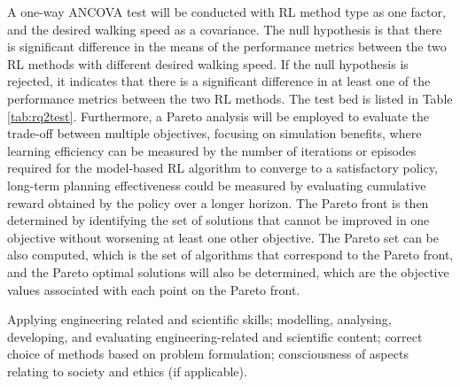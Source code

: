 A one-way ANCOVA test will be conducted with RL method type as one factor, and the desired walking speed as a covariance. The null hypothesis is that there is significant difference in the means of the performance metrics between the two RL methods with different desired walking speed. If the null hypothesis is rejected, it indicates that there is a significant difference in at least one of the performance metrics between the two RL methods. The test bed is listed in Table \ref{tab:rq2test}. Furthermore, a Pareto analysis will be employed to evaluate the trade-off between multiple objectives, focusing on simulation benefits, where learning efficiency can be measured by the number of iterations or episodes required for the model-based RL algorithm to converge to a satisfactory policy, long-term planning effectiveness could be measured by evaluating cumulative reward obtained by the policy over a longer horizon. The Pareto front is then determined by identifying the set of solutions that cannot be improved in one objective without worsening at least one other objective. The Pareto set can be also computed, which is the set of algorithms that correspond to the Pareto front, and the Pareto optimal solutions will also be determined, which are the objective values associated with each point on the Pareto front. 


Applying engineering related and scientific skills; modelling, analysing, developing, and evaluating engineering-related and scientific content; correct choice of methods based on problem formulation; consciousness of aspects relating to society and ethics (if applicable).

